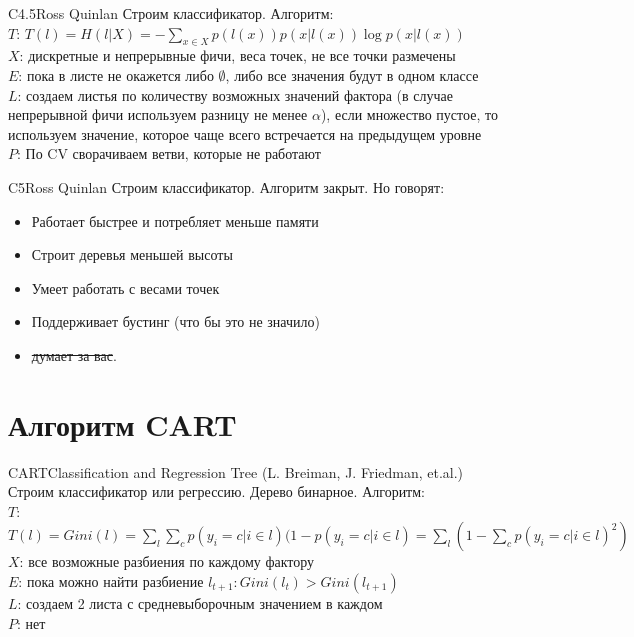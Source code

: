 \documentclass[14pt, fleqn, xcolor={dvipsnames, table}]{beamer}
\begin{document}
\begin{frame}{C4.5}{Ross Quinlan}
\small
Строим классификатор. Алгоритм:\\
{\color{blue}$T$:} $T(l) = H(l|X) = -\sum_{x\in X} p(l(x)) p(x|l(x)) \log p(x|l(x))$\\
{\color{blue}$X$:} дискретные и непрерывные фичи, веса точек, не все точки размечены \\
{\color{blue}$E$:} пока в листе не окажется либо $\emptyset$, либо все значения будут в одном классе \\
{\color{blue}$L$:} создаем листья по количеству возможных значений фактора (в случае непрерывной фичи используем разницу не менее $\alpha$), если множество пустое, то используем значение, которое чаще всего встречается на предыдущем уровне\\
{\color{blue}$P$:} По CV сворачиваем ветви, которые не работают
\end{frame}

\begin{frame}{C5}{Ross Quinlan}
\small
Строим классификатор. Алгоритм закрыт. Но говорят:\\
\begin{itemize}
  \item Работает быстрее и потребляет меньше памяти
  \item Строит деревья меньшей высоты
  \item Умеет работать с весами точек
  \item Поддерживает бустинг (что бы это не значило)
  \item \sout{думает за вас}.
\end{itemize}
\end{frame}

\section{Алгоритм CART}

\begin{frame}{CART}{Classification and Regression Tree (L. Breiman, J. Friedman, et.al.)}
\small
Строим классификатор или регрессию. Дерево бинарное. Алгоритм:\\
{\color{blue}$T$:} \footnotesize $T(l) = Gini(l) = \sum_l \sum_c p(y_i = c | i \in l)(1 - p(y_i=c|i \in l) = \sum_l (1 - \sum_c p(y_i=c|i \in l)^2)$ \\\small
{\color{blue}$X$:} все возможные разбиения по каждому фактору \\
{\color{blue}$E$:} пока можно найти разбиение $l_{t+1}: Gini(l_t) > Gini(l_{t+1})$\\
{\color{blue}$L$:} создаем 2 листа с средневыборочным значением в каждом \\
{\color{blue}$P$:} нет
\end{frame}
\end{document}
